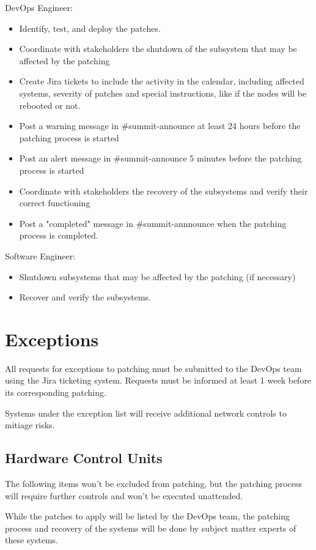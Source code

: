 DevOps Engineer:
\begin{itemize}
    \item Identify, test, and deploy the patches. 
    \item Coordinate with stakeholders the shutdown of the subsystem that may be affected by the patching
    \item Create Jira tickets to include the activity in the calendar, including affected systems, severity of patches and special instructions, like if the nodes will be rebooted or not. 
    \item Post a warning message in \#summit-announce at least 24 hours before the patching process is started
    \item Post an alert message in \#summit-announce 5 minutes before the patching process is started
    \item Coordinate with stakeholders the recovery of the subsystems and verify their correct functioning 
    \item Post a "completed" message in \#summit-annnounce when the patching process is completed. 
\end{itemize}

Software Engineer:
\begin{itemize}
    \item Shutdown subsystems that may be affected by the patching (if necessary)
    \item Recover and verify the subsystems. 
\end{itemize}

\section{Exceptions}

All requests for exceptions to patching must be submitted to the DevOps team using the Jira ticketing system. Requests must be informed at least 1 week before its corresponding patching. 

Systems under the exception list will receive additional network controls to mitiage risks. 

\subsection{Hardware Control Units}

The following items won't be excluded from patching, but the patching process will require further controls and won't be executed unattended. 

While the patches to apply will be listed by the DevOps team, the patching process and recovery of the systems will be done by subject matter experts of these systems.

